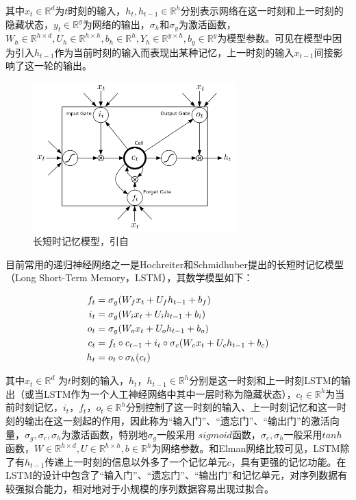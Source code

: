 其中$x_t \in \mathbb{R}^d $为$t$时刻的输入，$h_t, h_{t-1} \in \mathbb{R}^h $分别表示网络在这一时刻和上一时刻的隐藏状态，$y_t \in \mathbb{R}^y$为网络的输出，$\sigma_h$和$\sigma_y$为激活函数，$W_h \in \mathbb{R}^{h \times d}, U_h \in \mathbb{R} ^ {h \times h}, b_h \in \mathbb{R}^h, Y_h \in \mathbb{R}^{y \times h}, b_y \in \mathbb{R}^y$为模型参数。可见在模型中因为引入$h_{t-1}$作为当前时刻的输入而表现出某种记忆，上一时刻的输入$x_{t-1}$间接影响了这一轮的输出。

\begin{figure}[H]
  \centering
  \includegraphics[width=0.7\textwidth]{img/lstm.png}
  \caption{长短时记忆模型，引自\cite{graves2013hybrid}}
  \label{fig:lstm}
\end{figure}

目前常用的递归神经网络之一是Hochreiter和Schmidhuber\cite{hochreiter1997long}提出的长短时记忆模型（Long Short-Term Memory，LSTM），其数学模型如下：

\vspace{-10mm}
\begin{equation}
\vspace{-2.5mm}
\begin{aligned}
  \label{eq:lstm}
  f_t &= \sigma_g(W_f x_t + U_f h_{t - 1} + b_f) \\
  i_t &= \sigma_g(W_i x_t + U_i h_{t - 1} + b_i) \\
  o_t &= \sigma_g(W_o x_t + U_o h_{t - 1} + b_o) \\
  c_t &= f_t \circ c_{t-1} + i_t \circ \sigma_c (W_c x_t + U_c h_{t-1} + b_c) \\
  h_t &= o_t \circ \sigma_h (c_t)
\end{aligned}
\end{equation}

其中$x_t \in \mathbb{R}^d$ 为$t$时刻的输入，$h_t$，$h_{t-1} \in \mathbb{R}^h$分别是这一时刻和上一时刻LSTM的输出（或当LSTM作为一个人工神经网络中其中一层时称为隐藏状态），$c_t \in \mathbb{R}^h$为当前时刻记忆，$i_t$，$f_t$，$o_t \in \mathbb{R}^h$分别控制了这一时刻的输入、上一时刻记忆和这一时刻的输出在这一刻起的作用，因此称为“输入门”、“遗忘门”、“输出门”的激活向量，$\sigma_g, \sigma_c, \sigma_h$为激活函数，特别地$\sigma_g$一般采用 $sigmoid$函数，$\sigma_c, \sigma_h$一般采用$tanh$函数，$W \in \mathbb{R} ^ {h \times d}, U \in \mathbb{R}^{h \times h}, b \in \mathbb{R} ^ {h}$为网络参数。和Elman网络比较可见，LSTM除了有$h_{t-1}$传递上一时刻的信息以外多了一个记忆单元$c$，具有更强的记忆功能。在LSTM的设计中包含了“输入门”、“遗忘门”、“输出门”和记忆单元，对序列数据有较强拟合能力，相对地对于小规模的序列数据容易出现过拟合。

